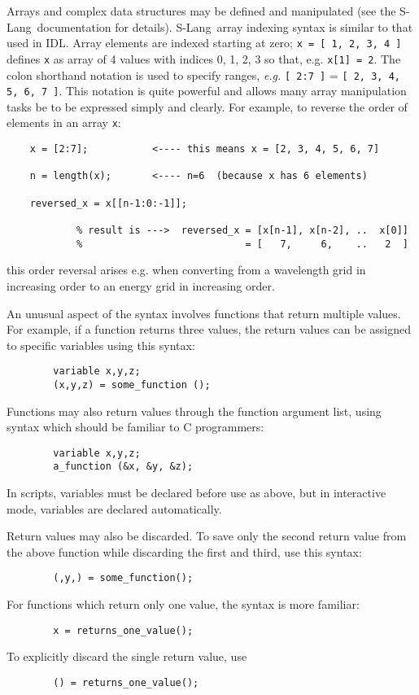 \documentclass{book}
\newcommand{\slang}{{\sc S-Lang}}
\begin{document}
{Arrays and complex data structures may be defined and manipulated
(see the \slang\ documentation for details).
\slang\ array indexing syntax is similar to that used in {\sc IDL}.
Array elements are indexed starting at zero;
{\tt x = [ 1, 2, 3, 4 ]} defines {\tt x} as array of 4 values with indices
0, 1, 2, 3 so that, e.g. {\tt x[1] = 2}. The colon shorthand notation is
used to specify ranges, {\it e.g.} {\tt [ 2:7 ]} = {\tt [ 2, 3, 4, 5, 6, 7
]}.  This notation is quite powerful and allows many array manipulation
tasks be to be expressed simply and clearly.  For example, to reverse the
order of elements in an array {\tt x}:
\begin{verbatim}
    x = [2:7];           <---- this means x = [2, 3, 4, 5, 6, 7]

    n = length(x);       <---- n=6  (because x has 6 elements)

    reversed_x = x[[n-1:0:-1]];

            % result is --->  reversed_x = [x[n-1], x[n-2], ..  x[0]]
            %                            = [   7,     6,    ..   2  ]
\end{verbatim}
this order reversal arises e.g. when converting from a wavelength grid
in increasing order to an energy grid in increasing order.

An unusual aspect of the syntax involves functions that return multiple
values.  For example, if a function returns three values, the return values
can be assigned to specific variables using this syntax:
\begin{verbatim}
        variable x,y,z;
        (x,y,z) = some_function ();
\end{verbatim}
Functions may also return values through the function argument
list, using syntax which should be familiar to C programmers:
\begin{verbatim}
        variable x,y,z;
        a_function (&x, &y, &z);
\end{verbatim}
In scripts, variables must be declared before use as above, but in interactive
mode, variables are declared automatically.

Return values may also be discarded. To save only the second
return value from the above function while discarding the first
and third, use this syntax:
\begin{verbatim}
        (,y,) = some_function();
\end{verbatim}
For functions which return only one value, the syntax is more familiar:
\begin{verbatim}
        x = returns_one_value();
\end{verbatim}
To explicitly discard the single return value, use
\begin{verbatim}
        () = returns_one_value();
\end{verbatim}

}
\end{document}
